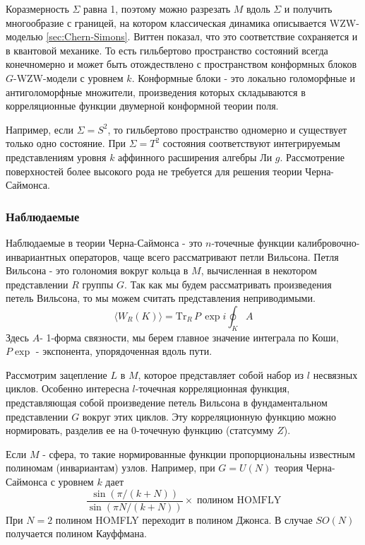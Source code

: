 \documentclass[a4paper,12pt]{article}
\theoremstyle{definition} \newtheorem{Def}{Definition}
\begin{document}
Коразмерность $\Sigma$ равна 1, поэтому можно разрезать $M$ вдоль $\Sigma$ и получить многообразие с границей, на котором классическая динамика описывается WZW-моделью \ref{sec:Chern-Simons}. Виттен показал, что это соответствие сохраняется и в квантовой механике. То есть гильбертово пространство состояний всегда конечномерно и может быть отождествлено с пространством конформных блоков $G$-WZW-модели с уровнем $k$. Конформные блоки - это локально голоморфные и антиголоморфные множители, произведения которых складываются в корреляционные функции двумерной конформной теории поля.

Например, если $\Sigma=S^2$, то гильбертово пространство одномерно и существует только одно состояние. При $\Sigma=T^2$ состояния соответствуют интегрируемым представлениям уровня $k$ аффинного расширения алгебры Ли $g$. Рассмотрение поверхностей более высокого рода не требуется для решения теории Черна-Саймонса.

\subsubsection{Наблюдаемые}
\label{sec:observables}

Наблюдаемые в теории Черна-Саймонса - это $n$-точечные функции калибровочно-инвариантных операторов, чаще всего рассматривают петли Вильсона. Петля Вильсона - это голономия вокруг кольца в $M$, вычисленная в некотором представлении $R$ группы $G$. Так как мы будем рассматривать произведения петель Вильсона, то мы можем считать представления неприводимыми.
\begin{equation}
  \label{eq:33}
    \langle W_R(K) \rangle =\text{Tr}_R \, P \, \exp{i \oint_K A}
\end{equation}
Здесь $A$- 1-форма связности, мы берем главное значение интеграла по Коши, $P \exp$ - экспонента, упорядоченная вдоль пути.

Рассмотрим зацепление $L$ в $M$, которое представляет собой набор из $l$ несвязных циклов. Особенно интересна $l$-точечная корреляционная функция, представляющая собой произведение петель Вильсона в фундаментальном представлении $G$ вокруг этих циклов. Эту корреляционную функцию можно нормировать, разделив ее на 0-точечную функцию (статсумму $Z$).

Если $M$ - сфера, то такие нормированные функции пропорциональны известным полиномам (инвариантам) узлов. Например, при $G=U(N)$ теория Черна-Саймонса с уровнем $k$ дает
\begin{equation}
  \label{eq:34}
      \frac{\sin(\pi/(k+N))}{\sin(\pi N/(k+N))}\times\;\mbox{полином HOMFLY}
\end{equation}
При $N=2$ полином HOMFLY переходит в полином Джонса. В случае $SO(N)$ получается полином Кауффмана.
\end{document}
